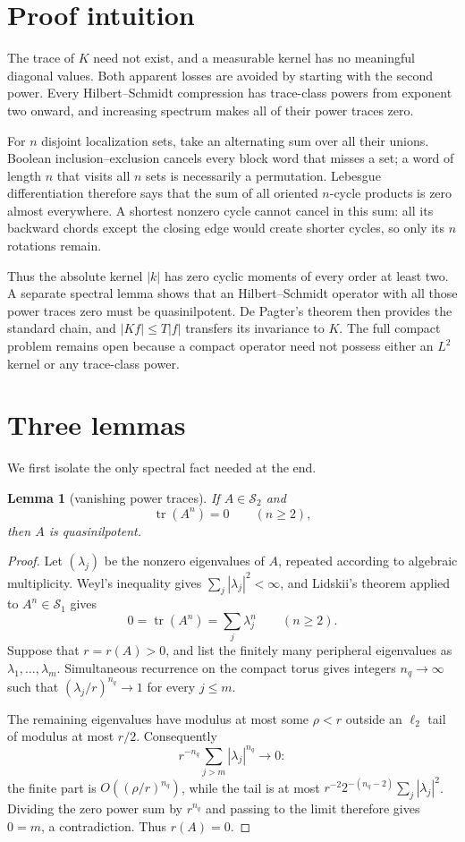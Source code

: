 \documentclass[11pt]{article}
\newtheorem{lemma}[theorem]{Lemma}
\newcommand{\Sone}{\mathcal S_1}
\newcommand{\Stwo}{\mathcal S_2}
\newcommand{\tr}{\operatorname{tr}}
\begin{document}
\section*{Proof intuition}

The trace of $K$ need not exist, and a measurable kernel has no meaningful
diagonal values.  Both apparent losses are avoided by starting with the
second power.  Every Hilbert--Schmidt compression has trace-class powers
from exponent two onward, and increasing spectrum makes all of their power
traces zero.

For $n$ disjoint localization sets, take an alternating sum over all their
unions.  Boolean inclusion--exclusion cancels every block word that misses a
set; a word of length $n$ that visits all $n$ sets is necessarily a
permutation.  Lebesgue differentiation therefore says that the sum of all
oriented $n$-cycle products is zero almost everywhere.  A shortest nonzero
cycle cannot cancel in this sum: all its backward chords except the closing
edge would create shorter cycles, so only its $n$ rotations remain.

Thus the absolute kernel $|k|$ has zero cyclic moments of every order at
least two.  A separate spectral lemma shows that an Hilbert--Schmidt operator
with all those power traces zero must be quasinilpotent.  De Pagter's theorem
then provides the standard chain, and $|Kf|\leq T|f|$ transfers its
invariance to $K$.  The full compact problem remains open because a compact
operator need not possess either an $L^2$ kernel or any trace-class power.

\section*{Three lemmas}

We first isolate the only spectral fact needed at the end.

\begin{lemma}[vanishing power traces]\label{lem:power}
If $A\in\Stwo$ and
\[
 \tr(A^n)=0\qquad(n\geq2),
\]
then $A$ is quasinilpotent.
\end{lemma}

\begin{proof}
Let $(\lambda_j)$ be the nonzero eigenvalues of $A$, repeated according to
algebraic multiplicity.  Weyl's inequality gives
$\sum_j|\lambda_j|^2<\infty$, and Lidskii's theorem applied to $A^n\in\Sone$
gives
\[
 0=\tr(A^n)=\sum_j\lambda_j^n\qquad(n\geq2).
\]
Suppose that $r=r(A)>0$, and list the finitely many peripheral eigenvalues
as $\lambda_1,\ldots,\lambda_m$.  Simultaneous recurrence on the compact
torus gives integers $n_q\to\infty$ such that
$(\lambda_j/r)^{n_q}\to1$ for every $j\leq m$.

The remaining eigenvalues have modulus at most some $\rho<r$ outside an
$\ell_2$ tail of modulus at most $r/2$.  Consequently
\[
 r^{-n_q}\sum_{j>m}|\lambda_j|^{n_q}\longrightarrow0:
\]
the finite part is $O((\rho/r)^{n_q})$, while the tail is at most
$r^{-2}2^{-(n_q-2)}\sum_j|\lambda_j|^2$.  Dividing the zero power sum by
$r^{n_q}$ and passing to the limit therefore gives $0=m$, a contradiction.
Thus $r(A)=0$.
\end{proof}
\end{document}

